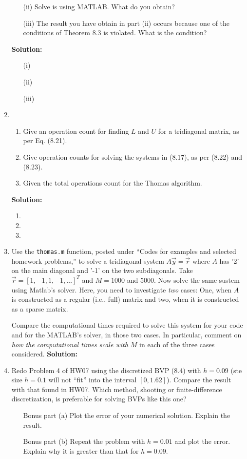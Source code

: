 \documentclass[11pt]{article}
\begin{document}
\begin{enumerate}
\begin{enumerate}
\item[(ii)] Solve is using MATLAB. What do you obtain?
\item[(iii)] The result you have obtain in part (ii) occurs because one of the conditions of Theorem 8.3 is violated.
What is the condition?
\end{enumerate}

\bigskip
\textbf{Solution:} 
\begin{enumerate}
\item[(i)] 
\item[(ii)] 
\item[(iii)] 
\end{enumerate}

\item 
\begin{enumerate}
\item Give an operation count for finding $L$ and $U$ for a tridiagonal matrix, as per Eq. (8.21).
\item Give operation counts for solving the systems in (8.17), as per (8.22) and (8.23). 
\item Given the total operations count for the Thomas algorithm.
\end{enumerate}

\bigskip
\textbf{Solution:} 
\begin{enumerate}
\item
\item 
\item 
\end{enumerate}

\item Use the \verb|thomas.m| function, posted under ``Codes for examples and selected homework problems,'' to solve a tridiagonal system $A\vec{y} = \vec{r}$ where $A$ has '2' on the main diagonal and '-1' on the two subdiagonals.
Take $\vec{r} = [1,-1,1,-1,\ldots]^T$ and $M = 1000$ and 5000.
Now solve the same sustem using Matlab's solver.
Here, you need to investigate {\em two} cases: One, when $A$ is constructed as a regular (i.e., full) matrix and two, when it is constructed as a sparse matrix.

Compare the computational times required to solve this system for your code and for the MATLAB's solver, in those two cases.
In particular, comment on {\em how the computational times scale with $M$} in each of the three cases considered.
\bigskip
\textbf{Solution:} 

\item Redo Problem 4 of HW07 using the discretized BVP (8.4) with $h = 0.09$ (ste size $h = 0.1$ will not ``fit'' into the interval $[0,1.62]$).
Compare the result with that found in HW07.
Which method, shooting or finite-difference discretization, is preferable for solving BVPs like this one?
\begin{enumerate}
\item[Bonus part (a)] Plot the error of your numerical solution. Explain the result.
\item[Bonus part (b)] Repeat the problem with $h = 0.01$ and plot the error. Explain why it is greater than that for $h = 0.09$.
\end{enumerate}


\end{enumerate}
\end{document}
